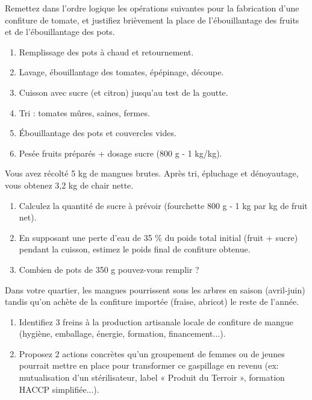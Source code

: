 \documentclass[11pt]{article}
\begin{document}
\begin{exercice}
Remettez dans l'ordre logique les opérations suivantes pour la fabrication d'une confiture de tomate, et justifiez brièvement la place de l'ébouillantage des fruits et de l'ébouillantage des pots.
\begin{enumerate}
    \item Remplissage des pots à chaud et retournement.
    \item Lavage, ébouillantage des tomates, épépinage, découpe.
    \item Cuisson avec sucre (et citron) jusqu'au test de la goutte.
    \item Tri : tomates mûres, saines, fermes.
    \item Ébouillantage des pots et couvercles vides.
    \item Pesée fruits préparés + dosage sucre (800 g - 1 kg/kg).
\end{enumerate}
\end{exercice}

\begin{exercice}
Vous avez récolté 5 kg de mangues brutes. Après tri, épluchage et dénoyautage, vous obtenez 3,2 kg de chair nette.
\begin{enumerate}
    \item Calculez la quantité de sucre à prévoir (fourchette 800 g - 1 kg par kg de fruit net).
    \item En supposant une perte d'eau de 35 \% du poids total initial (fruit + sucre) pendant la cuisson, estimez le poids final de confiture obtenue.
    \item Combien de pots de 350 g pouvez-vous remplir ?
\end{enumerate}
\end{exercice}

\begin{exercice}
Dans votre quartier, les mangues pourrissent sous les arbres en saison (avril-juin) tandis qu'on achète de la confiture importée (fraise, abricot) le reste de l'année.
\begin{enumerate}
    \item Identifiez 3 freins à la production artisanale locale de confiture de mangue (hygiène, emballage, énergie, formation, financement...).
    \item Proposez 2 actions concrètes qu'un groupement de femmes ou de jeunes pourrait mettre en place pour transformer ce gaspillage en revenu (ex: mutualisation d'un stérilisateur, label « Produit du Terroir », formation HACCP simplifiée...).
\end{enumerate}
\end{exercice}
\end{document}
